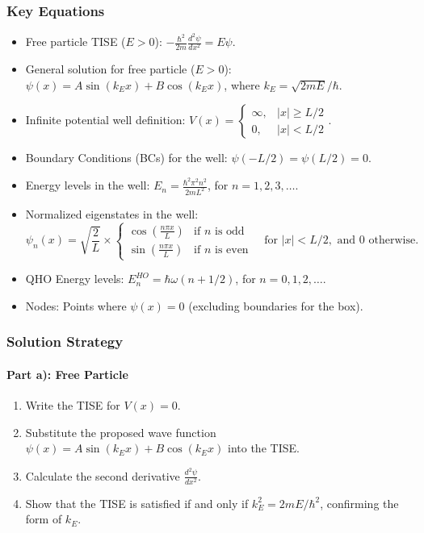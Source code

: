 \documentclass[10pt]{article}
\begin{document}
\subsubsection*{Key Equations}
\begin{itemize}
    \item Free particle TISE (\(E>0\)): \(-\frac{\hbar^2}{2m}\frac{d^2\psi}{dx^2} = E\psi\).
    \item General solution for free particle (\(E>0\)): \(\psi(x) = A\sin(k_E x) + B\cos(k_E x)\), where \(k_E = \sqrt{2mE}/\hbar\).
    \item Infinite potential well definition: \(V(x) = \begin{cases} \infty, & |x| \geq L/2 \\ 0, & |x|<L/2 \end{cases}\).
    \item Boundary Conditions (BCs) for the well: \(\psi(-L/2) = \psi(L/2) = 0\).
    \item Energy levels in the well: \(E_n = \frac{\hbar^2 \pi^2 n^2}{2mL^2}\), for \(n=1, 2, 3, \dots\).
    \item Normalized eigenstates in the well:
    \[ \psi_n(x) = \sqrt{\frac{2}{L}} \times \begin{cases} \cos(\frac{n\pi x}{L}) & \text{if } n \text{ is odd} \\ \sin(\frac{n\pi x}{L}) & \text{if } n \text{ is even} \end{cases} \quad \text{for } |x| < L/2, \text{ and } 0 \text{ otherwise.} \]
    \item QHO Energy levels: \(E_n^{HO} = \hbar\omega(n+1/2)\), for \(n=0, 1, 2, \dots\).
    \item Nodes: Points where \(\psi(x)=0\) (excluding boundaries for the box).
\end{itemize}

\subsubsection*{Solution Strategy}

\paragraph{Part a): Free Particle}
\begin{enumerate}
    \item Write the TISE for \(V(x)=0\).
    \item Substitute the proposed wave function \(\psi(x) = A \sin(k_E x) + B \cos(k_E x)\) into the TISE.
    \item Calculate the second derivative \(\frac{d^2\psi}{dx^2}\).
    \item Show that the TISE is satisfied if and only if \(k_E^2 = 2mE/\hbar^2\), confirming the form of \(k_E\).
\end{enumerate}
\end{document}
